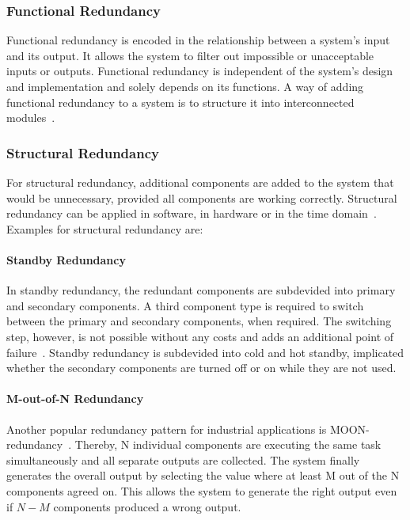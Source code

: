 \subsubsection{Functional Redundancy}
Functional redundancy is encoded in the relationship between a system's input and its output.
It allows the system to filter out impossible or unacceptable inputs or outputs.
Functional redundancy is independent of the system's design and implementation and solely depends on its functions.
A way of adding functional redundancy to a system is to structure it into interconnected modules~\cite{GeffroyMotetDependableComputing}.

\subsubsection{Structural Redundancy}
For structural redundancy, additional components are added to the system that would be unnecessary, provided all components are working correctly.
Structural redundancy can be applied in software, in hardware or in the time domain~\cite{GeffroyMotetDependableComputing}.
Examples for structural redundancy are:

\paragraph{Standby Redundancy}
In standby redundancy, the redundant components are subdevided into primary and secondary components.
A third component type is required to switch between the primary and secondary components, when required.
The switching step, however, is not possible without any costs and adds an additional point of failure~\cite{PepperlFuchs}.
Standby redundancy is subdevided into cold and hot standby, implicated whether the secondary components are turned off or on while they are not used.

\paragraph{M-out-of-N Redundancy}
Another popular redundancy pattern for industrial applications is \gls*{MOON}-redundancy~\cite{GamerIncreasingMOON}.
Thereby, N individual components are executing the same task simultaneously and all separate outputs are collected.
The system finally generates the overall output by selecting the value where at least M out of the N components agreed on.
This allows the system to generate the right output even if $N-M$ components produced a wrong output.




